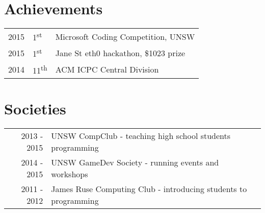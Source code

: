 \documentclass[letter]{deedy-resume} %
\begin{document}
\begin{minipage}[t]{0.66\textwidth}


\section{Achievements} 

\begin{tabular}{rll}
2015 & 1\textsuperscript{st} & Microsoft Coding Competition, UNSW \\
2015 & 1\textsuperscript{st} & Jane St eth0 hackathon, \$1023 prize \\
2014 & 11\textsuperscript{th} & ACM ICPC Central Division \\
\end{tabular}

\sectionspace %


\section{Societies} 

\begin{tabular}{rll}
2013 - 2015 & UNSW CompClub - teaching high school students programming \\
2014 - 2015 & UNSW GameDev Society - running events and workshops \\
2011 - 2012 & James Ruse Computing Club - introducing students to programming \\
\end{tabular}

\sectionspace %


\end{minipage} %



\end{document}
